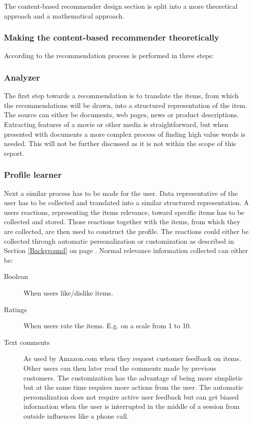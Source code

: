 The content-based recommender design section is split into a more theoretical approach and a mathematical approach.

\subsubsection{Making the content-based recommender theoretically}

According to \cite{RecSysHandbook} the recommendation process is performed in three steps:

\subsubsection{Analyzer}

The first step towards a recommendation is to translate the items, from which the recommendations will be drawn, into a structured representation of the item. The source can either be documents, web pages, news or product descriptions. Extracting features of a movie or other media is straightforward, but when presented with documents a more complex process of finding high value words is needed. This will not be further discussed as it is not within the scope of this report.    
 
\subsubsection{Profile learner}

Next a similar process has to be made for the user. Data representative of the user has to be collected and translated into a similar structured representation. A users reactions, representing the items relevance, toward specific items has to be collected and stored. Those reactions together with the items, from which they are collected, are then used to construct the profile. The reactions could either be collected through automatic personalization or customization as described in Section \ref{Background} on page \pageref{Background}. Normal relevance information collected can either be:

\begin{description}
\item[Boolean] When users like/dislike items.


\item[Ratings] When users rate the items. E.g. on a scale from 1 to 10.


\item[Text comments] As used by Amazon.com when they request customer feedback on items. Other users can then later read the comments made by previous customers. The customization has the advantage of being more simplistic but at the same time requires more actions from the user. The automatic personalization does not require active user feedback but can get biased information when the user is interrupted in the middle of a session from outside influences like a phone call.
\end{description}


